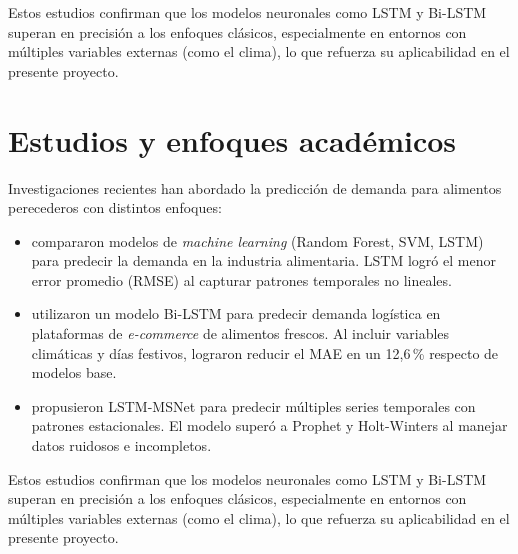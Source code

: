  Estos estudios confirman que los modelos neuronales como LSTM y Bi-LSTM superan en precisión a los enfoques clásicos, especialmente en entornos con múltiples variables externas (como el clima), lo que refuerza su aplicabilidad en el presente proyecto.

\section{Estudios y enfoques académicos}

Investigaciones recientes han abordado la predicción de demanda para alimentos perecederos con distintos enfoques:

\begin{itemize}
    \item \textcite{nassibi2023} compararon modelos de \textit{machine learning} (Random Forest, SVM, LSTM) para predecir la demanda en la industria alimentaria. LSTM logró el menor error promedio (RMSE) al capturar patrones temporales no lineales.

    \item \textcite{ni2022} utilizaron un modelo Bi-LSTM para predecir demanda logística en plataformas de \textit{e-commerce} de alimentos frescos. Al incluir variables climáticas y días festivos, lograron reducir el MAE en un 12{,}6\,\% respecto de modelos base.

    \item \textcite{bandara2020} propusieron LSTM-MSNet para predecir múltiples series temporales con patrones estacionales. El modelo superó a Prophet y Holt-Winters al manejar datos ruidosos e incompletos.
\end{itemize}

Estos estudios confirman que los modelos neuronales como LSTM y Bi-LSTM superan en precisión a los enfoques clásicos, especialmente en entornos con múltiples variables externas (como el clima), lo que refuerza su aplicabilidad en el presente proyecto.



